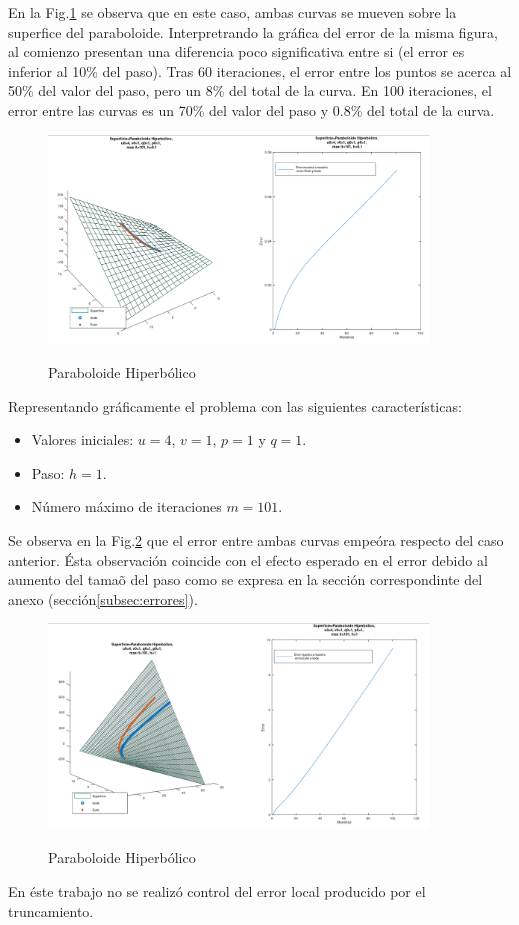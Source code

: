 \documentclass{endm}
\begin{document}
En la Fig.\ref{ph} se observa que en este caso, ambas curvas se mueven sobre la superfice del paraboloide. Interpretrando la gr\'afica del error de la misma figura, al comienzo presentan una diferencia poco significativa entre si (el error es inferior al 10\% del paso). Tras 60 iteraciones, el error entre los puntos se acerca al 50\% del valor del paso, pero un 8\% del total de la curva. En 100 iteraciones, el error entre las curvas es un 70\% del valor del paso y 0.8\% del total de la curva.

\begin{figure}[H]
\caption{Paraboloide Hiperb\'olico}
\centering
\includegraphics[width=0.9\textwidth]{ph.png}
\label{ph}
\end{figure}

Representando gr\'aficamente el problema con las siguientes caracter\'isticas:
\begin{itemize}
    \item Valores iniciales: $u=4$, $v=1$, $p=1$ y $q=1$.
    \item Paso: $h=1$.
    \item N\'umero m\'aximo de iteraciones $m=101$.
\end{itemize}

Se observa en la Fig.\ref{phmal} que el error entre ambas curvas empe\'ora respecto del caso anterior. \'Esta observaci\'on coincide con el efecto esperado en el error debido al aumento del tama\~o del paso como se expresa en la secci\'on correspondinte del anexo (secci\'on\ref{subsec:errores}).

\begin{figure}[H]
\caption{Paraboloide Hiperb\'olico}
\centering
\includegraphics[width=0.9\textwidth]{phmal.png}
\label{phmal}
\end{figure}
En \'este trabajo no se realiz\'o control del error local producido por el truncamiento.
%
\end{document}
